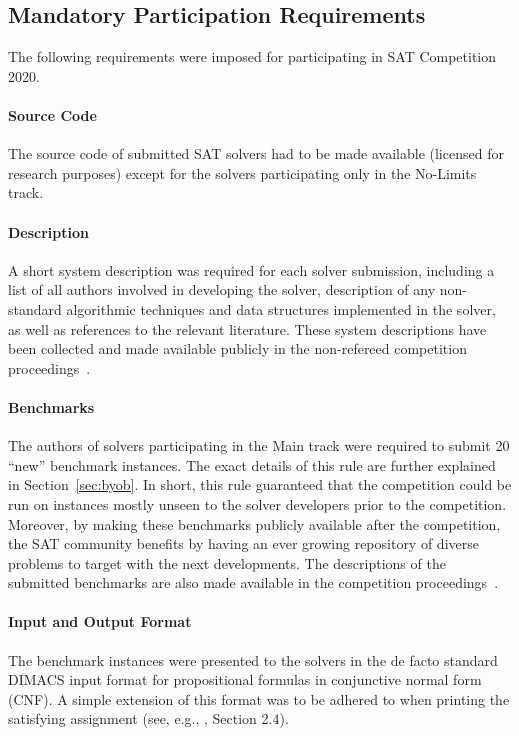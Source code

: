 \documentclass{elsarticle}
\begin{document}
\subsection{Mandatory Participation Requirements}
\label{sec:rules}

The following requirements were imposed for 
participating in SAT Competition 2020.

\paragraph{Source Code}
The source code of submitted SAT solvers had to be made available 
(licensed for research purposes) except for the solvers participating only in the No-Limits track.

\paragraph{Description}
A short system description was required for each solver submission,
including a list of all  authors involved in developing the solver,  description of any non-standard algorithmic
techniques and data structures implemented in the solver, as well as references to the relevant literature.
These system descriptions have been collected and made available publicly in the non-refereed competition
proceedings~\cite{SC2020}.

\paragraph{Benchmarks}
The authors of solvers participating in the Main track were required 
  to submit 20 ``new'' benchmark instances.
The exact details of this rule are further explained in Section~\ref{sec:byob}.
In short, this rule guaranteed that the competition could be run on instances mostly unseen to the solver
developers prior to the competition. Moreover, by making these benchmarks publicly available
after the competition, the SAT community benefits by having an ever growing repository 
of diverse problems to target with the next developments.
The descriptions of the submitted benchmarks are also made available in the competition proceedings~\cite{SC2020}.

\paragraph{Input and Output Format}

The benchmark instances were presented to the solvers in the de facto standard
DIMACS input format for propositional formulas in conjunctive normal form (CNF).
A simple extension of this format was to be adhered to when printing 
the satisfying assignment 
(see, e.g., \cite{DBLP:journals/jsat/HeuleJS19}, Section 2.4).
\end{document}
